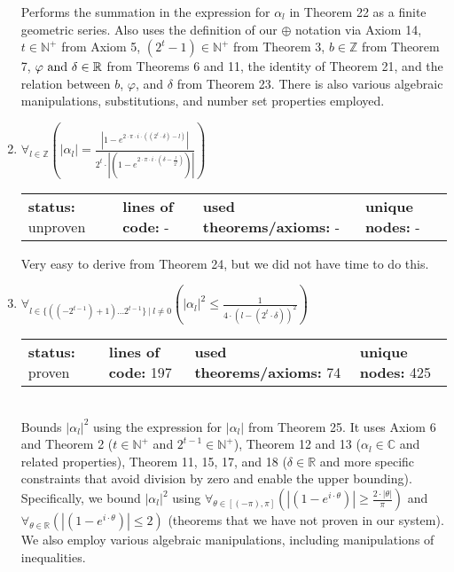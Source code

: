 \documentclass{article}[12pt]
\begin{document}
\begin{enumerate}
  Performs the summation in the expression for $\alpha_l$ in Theorem 22 as a finite geometric series.  Also uses the definition of our $\oplus$ notation via Axiom 14, $t \in \mathbb{N}^+$ from Axiom 5, $(2^t - 1) \in \mathbb{N}^+$ from Theorem 3, $b \in \mathbb{Z}$ from Theorem 7, $\varphi~{\rm and}~\delta \in \mathbb{R}$ from Theorems 6 and 11, the identity of Theorem 21, and the relation between $b$, $\varphi$, and $\delta$ from Theorem 23.  There is also various algebraic manipulations, substitutions, and number set properties employed.
\item $\forall_{l \in \mathbb{Z}} \left(\left|\alpha_{l}\right| = \frac{\left|1 - e^{2 \cdot \pi \cdot i \cdot \left(\left(2^{t} \cdot \delta\right) - l\right)}\right|}{2^{t} \cdot \left|\left(1 - e^{2 \cdot \pi \cdot i \cdot \left(\delta - \frac{l}{2^{t}}\right)}\right)\right|}\right)$ \hfill \\
  \begin{tabular}{l | l | l | l}
    \textbf{status:} unproven & \textbf{lines of code:} - & \textbf{used theorems/axioms:} - & \textbf{unique nodes:} -        
  \end{tabular}
Very easy to derive from Theorem 24, but we did not have time to do this.
\item $\forall_{l \in \{\left(\left(-2^{t - 1}\right) + 1\right)\ldots 2^{t - 1}\}~|~l \neq 0} \left(\left|\alpha_{l}\right|^{2} \leq \frac{1}{4 \cdot \left(l - \left(2^{t} \cdot \delta\right)\right)^{2}}\right)$ \hfill \\
  \begin{tabular}{l | l | l | l}
    \textbf{status:} proven & \textbf{lines of code:} 197 & \textbf{used theorems/axioms:} 74 & \textbf{unique nodes:} 425
  \end{tabular} \hfill \\
  Bounds $\lvert \alpha_l \rvert^2$ using the expression for $\lvert \alpha_l \rvert$ from Theorem 25.  It uses Axiom 6 and Theorem 2 ($t \in \mathbb{N}^+$ and $2^{t-1} \in \mathbb{N}^+$), Theorem 12 and 13 ($\alpha_l \in \mathbb{C}$ and related properties), Theorem 11, 15, 17, and 18 ($\delta \in \mathbb{R}$ and more specific constraints that avoid division by zero and enable the upper bounding).  Specifically, we bound $\lvert \alpha_l \rvert^2$ using $\forall_{\theta \in \left[\left(-\pi\right),\pi\right]} \left(\left|\left(1 - e^{i \cdot \theta}\right)\right| \geq \frac{2 \cdot \left|\theta\right|}{\pi}\right)$ and $\forall_{\theta \in \mathbb{R}} \left(\left|\left(1 - e^{i \cdot \theta}\right)\right| \leq 2\right)$ (theorems that we have not proven in our system).  We also employ various algebraic manipulations, including manipulations of inequalities.

\end{enumerate}
\end{document}
